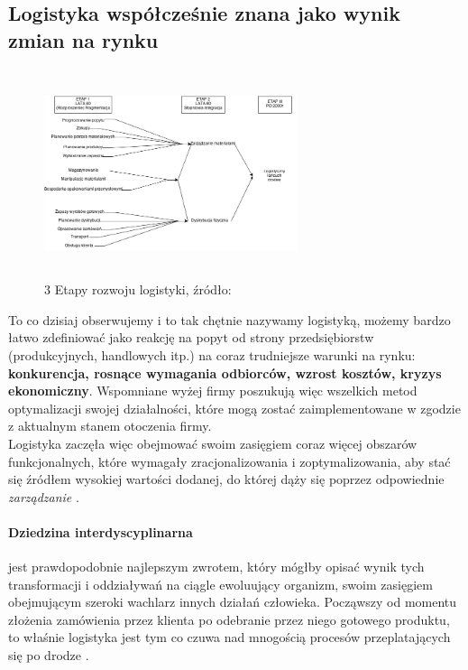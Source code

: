 	\subsection{Logistyka współcześnie znana jako wynik zmian na rynku}
		\begin{figure}[h]
			\centering
			\includegraphics[width=280px, height=230px]{images/etapy_rozwoju_logistyki}
			\caption[3 etapy rozwoju logistyki]{
				3 Etapy rozwoju logistyki, źródło: \cite{logityka_w_przedsiebiorstwie_sarsjusz_wolski_skowronek}
			}
		\end{figure}
		To co dzisiaj obserwujemy i to tak chętnie nazywamy logistyką, 
		możemy bardzo łatwo zdefiniować jako reakcję na popyt od
		strony przedsiębiorstw (produkcyjnych, handlowych itp.) na coraz trudniejsze warunki na
		rynku: \textbf{konkurencja, rosnące wymagania odbiorców, wzrost kosztów, kryzys ekonomiczny}.
		Wspomniane wyżej firmy poszukują więc wszelkich metod optymalizacji swojej działalności, 
		które mogą zostać zaimplementowane w zgodzie z aktualnym stanem otoczenia firmy.\\
		Logistyka zaczęła więc obejmować swoim zasięgiem coraz więcej obszarów funkcjonalnych, które
		wymagały zracjonalizowania i zoptymalizowania, aby stać się źródłem wysokiej wartości dodanej, do której
		dąży się poprzez odpowiednie \emph{zarządzanie} \cite{logistyka_jako_dziedzina_wiedzy_cz1}.
		
		\paragraph{Dziedzina interdyscyplinarna} jest prawdopodobnie najlepszym zwrotem, 
		który mógłby opisać wynik tych transformacji i oddziaływań na ciągle ewoluujący organizm, swoim
		zasięgiem obejmującym szeroki wachlarz innych działań człowieka. Począwszy od momentu złożenia
		zamówienia przez klienta po odebranie przez niego gotowego produktu, to właśnie logistyka jest
		tym co czuwa nad mnogością procesów przeplatających się po drodze \cite{logistyka_jako_dziedzina_wiedzy_cz2}.	
